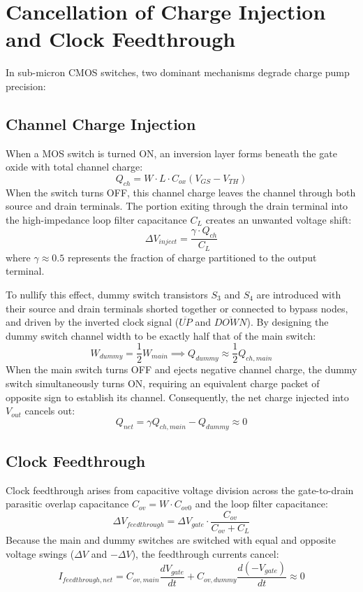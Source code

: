 \documentclass[11pt,a4paper]{report}
\begin{document}
\section{Cancellation of Charge Injection and Clock Feedthrough}
In sub-micron CMOS switches, two dominant mechanisms degrade charge pump precision:
\subsection{Channel Charge Injection}
When a MOS switch is turned ON, an inversion layer forms beneath the gate oxide with total channel charge:
\begin{equation}
    Q_{ch} = W \cdot L \cdot C_{ox} (V_{GS} - V_{TH})
\end{equation}
When the switch turns OFF, this channel charge leaves the channel through both source and drain terminals. The portion exiting through the drain terminal into the high-impedance loop filter capacitance $C_L$ creates an unwanted voltage shift:
\begin{equation}
    \Delta V_{inject} = \frac{\gamma \cdot Q_{ch}}{C_L}
\end{equation}
where $\gamma \approx 0.5$ represents the fraction of charge partitioned to the output terminal.

To nullify this effect, dummy switch transistors $S_3$ and $S_4$ are introduced with their source and drain terminals shorted together or connected to bypass nodes, and driven by the inverted clock signal ($\overline{UP}$ and $\overline{DOWN}$). By designing the dummy switch channel width to be exactly half that of the main switch:
\begin{equation}
    W_{dummy} = \frac{1}{2} W_{main} \implies Q_{dummy} \approx \frac{1}{2} Q_{ch, main}
\end{equation}
When the main switch turns OFF and ejects negative channel charge, the dummy switch simultaneously turns ON, requiring an equivalent charge packet of opposite sign to establish its channel. Consequently, the net charge injected into $V_{out}$ cancels out:
\begin{equation}
    Q_{net} = \gamma Q_{ch, main} - Q_{dummy} \approx 0
\end{equation}

\subsection{Clock Feedthrough}
Clock feedthrough arises from capacitive voltage division across the gate-to-drain parasitic overlap capacitance $C_{ov} = W \cdot C_{ov0}$ and the loop filter capacitance:
\begin{equation}
    \Delta V_{feedthrough} = \Delta V_{gate} \cdot \frac{C_{ov}}{C_{ov} + C_L}
\end{equation}
Because the main and dummy switches are switched with equal and opposite voltage swings ($\Delta V$ and $-\Delta V$), the feedthrough currents cancel:
\begin{equation}
    I_{feedthrough, net} = C_{ov, main} \frac{d V_{gate}}{dt} + C_{ov, dummy} \frac{d(-V_{gate})}{dt} \approx 0
\end{equation}
\end{document}
